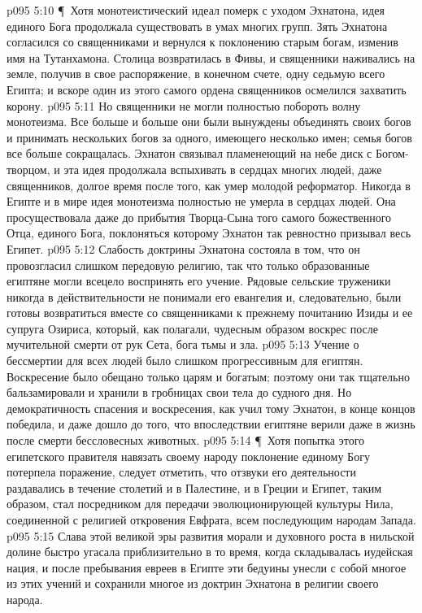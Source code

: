 \vs p095 5:10 \P\ Хотя монотеистический идеал померк с уходом Эхнатона, идея единого Бога продолжала существовать в умах многих групп. Зять Эхнатона согласился со священниками и вернулся к поклонению старым богам, изменив имя на Тутанхамона. Столица возвратилась в Фивы, и священники наживались на земле, получив в свое распоряжение, в конечном счете, одну седьмую всего Египта; и вскоре один из этого самого ордена священников осмелился захватить корону.
\vs p095 5:11 Но священники не могли полностью побороть волну монотеизма. Все больше и больше они были вынуждены объединять своих богов и принимать нескольких богов за одного, имеющего несколько имен; семья богов все больше сокращалась. Эхнатон связывал пламенеющий на небе диск с Богом\hyp{}творцом, и эта идея продолжала вспыхивать в сердцах многих людей, даже священников, долгое время после того, как умер молодой реформатор. Никогда в Египте и в мире идея монотеизма полностью не умерла в сердцах людей. Она просуществовала даже до прибытия Творца\hyp{}Сына того самого божественного Отца, единого Бога, поклоняться которому Эхнатон так ревностно призывал весь Египет.
\vs p095 5:12 Слабость доктрины Эхнатона состояла в том, что он провозгласил слишком передовую религию, так что только образованные египтяне могли всецело воспринять его учение. Рядовые сельские труженики никогда в действительности не понимали его евангелия и, следовательно, были готовы возвратиться вместе со священниками к прежнему почитанию Изиды и ее супруга Озириса, который, как полагали, чудесным образом воскрес после мучительной смерти от рук Сета, бога тьмы и зла.
\vs p095 5:13 Учение о бессмертии для всех людей было слишком прогрессивным для египтян. Воскресение было обещано только царям и богатым; поэтому они так тщательно бальзамировали и хранили в гробницах свои тела до судного дня. Но демократичность спасения и воскресения, как учил тому Эхнатон, в конце концов победила, и даже дошло до того, что впоследствии египтяне верили даже в жизнь после смерти бессловесных животных.
\vs p095 5:14 \P\ Хотя попытка этого египетского правителя навязать своему народу поклонение единому Богу потерпела поражение, следует отметить, что отзвуки его деятельности раздавались в течение столетий и в Палестине, и в Греции и Египет, таким образом, стал посредником для передачи эволюционирующей культуры Нила, соединенной с религией откровения Евфрата, всем последующим народам Запада.
\vs p095 5:15 Слава этой великой эры развития морали и духовного роста в нильской долине быстро угасала приблизительно в то время, когда складывалась иудейская нация, и после пребывания евреев в Египте эти бедуины унесли с собой многое из этих учений и сохранили многое из доктрин Эхнатона в религии своего народа.
